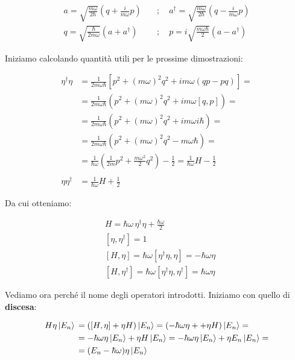 \begin{align}
a= \sqrt{\frac{m\omega}{2\hbar}}(q+ \frac{i}{m\omega}p)\quad &; \quad a^\dagger = \sqrt{\frac{m\omega}{2\hbar}}(q- \frac{i}{m\omega}p) \\
q= \sqrt{\frac{\hbar}{2m\omega}}(a + a^\dagger) \quad &; \quad p= i\sqrt{\frac{m\omega \hbar}{2}}(a - a^\dagger)
\end{align}

Iniziamo calcolando quantità utili per le prossime dimostrazioni:

\begin{align}
\eta^\dagger \eta {}&= \frac{1}{2m\omega\hbar}[p^2 + (m\omega)^2 q^2 + im\omega(qp - pq)]= \nonumber \\
& = \frac{1}{2m\omega\hbar}(p^2 + (m\omega)^2 q^2 + im\omega[q,p])= \nonumber \\
&= \frac{1}{2m\omega\hbar}(p^2 + (m\omega)^2 q^2 + im\omega i\hbar)= \nonumber \\
&= \frac{1}{2m\omega\hbar}(p^2 + (m\omega)^2 q^2 - m\omega\hbar) = \nonumber \\
&= \frac{1}{\hbar\omega}\left(\frac{1}{2m}p^2 + \frac{m\omega^2}{2} q^2\right) - \frac{1}{2}= \frac{1}{\hbar\omega}H -\frac{1}{2} \\
\nonumber \\
\eta \eta^\dagger &= \frac{1}{\hbar\omega}H +\frac{1}{2}
\end{align}
 
Da cui otteniamo: 

\begin{align}
{}&H =\hbar\omega \, \eta^\dagger \eta + \frac{\hbar\omega}{2} \\
&[\eta,\eta^\dagger]=1 \\
&[H,\eta]= \hbar\omega [\eta^\dagger \eta, \eta]= -\hbar\omega \eta \\
&[H,\eta^\dagger]= \hbar\omega [\eta^\dagger \eta, \eta^\dagger]= \hbar\omega \eta
\end{align}

Vediamo ora perché il nome degli operatori introdotti. Iniziamo con quello di \textbf{discesa}:

\begin{align}
H\eta\ket{E_n} {}&= ([H,\eta] +\eta H)\ket{E_n}= (-\hbar\omega \eta + +\eta H)\ket{E_n}= \nonumber \\
&= -\hbar\omega \eta \ket{E_n} + \eta H \ket{E_n} = -\hbar\omega \eta \ket{E_n} + \eta E_n \ket{E_n}=\nonumber \\
&=  (E_n-\hbar \omega) \eta \ket{E_n}
\end{align}

